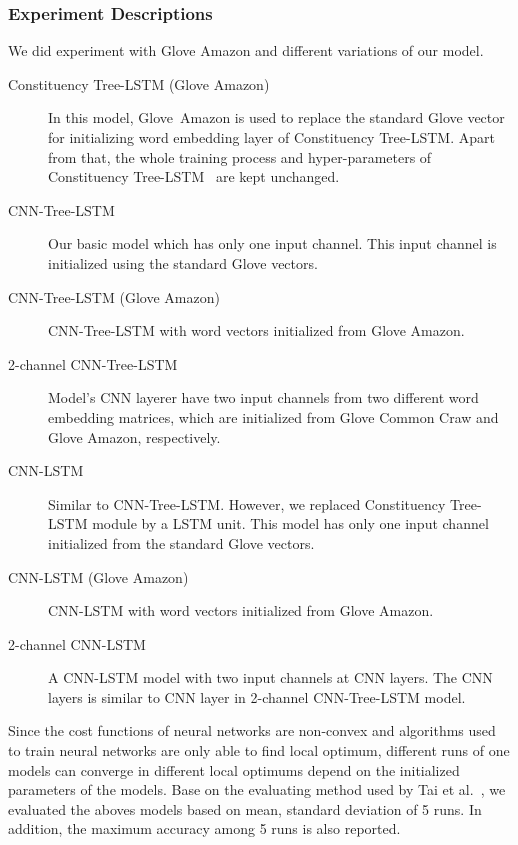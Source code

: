 \subsubsection{Experiment Descriptions}
We did experiment with Glove Amazon and different variations of our model.
\begin{description}
	\item[Constituency Tree-LSTM (Glove Amazon)] In this model, Glove~Amazon is used to replace the standard Glove vector for initializing word embedding layer of Constituency Tree-LSTM.
	Apart from that, the whole training process and hyper-parameters of Constituency Tree-LSTM~\cite{treeLSTM} are kept unchanged.
	\item[CNN-Tree-LSTM] Our basic model which has only one input channel.
	This input channel is initialized using the standard Glove vectors.
	\item[CNN-Tree-LSTM (Glove Amazon)] CNN-Tree-LSTM with word vectors initialized from Glove Amazon.
	\item [2-channel CNN-Tree-LSTM] Model's CNN layerer have two input channels from two different word embedding matrices, which are initialized from Glove Common Craw and Glove Amazon, respectively.
	\item[CNN-LSTM] Similar to CNN-Tree-LSTM. However, we replaced Constituency Tree-LSTM module by a LSTM unit.
	This model has only one input channel initialized from the standard Glove vectors.
	\item [CNN-LSTM (Glove Amazon)] CNN-LSTM with word vectors initialized from Glove Amazon.
	\item [2-channel CNN-LSTM] A CNN-LSTM model with two input channels at CNN layers. The CNN layers is similar to CNN layer in 2-channel CNN-Tree-LSTM model.
\end{description}

Since the cost functions of neural networks are non-convex and algorithms used to train neural networks are only able to find local optimum, different runs of one models can converge in different local optimums depend on the initialized parameters of the models.  
Base on the evaluating method used by Tai et al.~\cite{treeLSTM}, we evaluated the aboves models based on mean, standard deviation of 5 runs.
In addition, the maximum accuracy among 5 runs is also reported.

